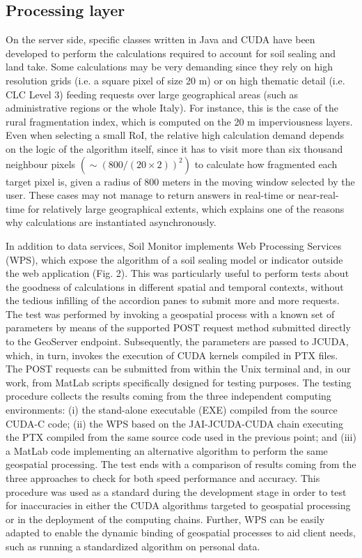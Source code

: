 \documentclass[APA,LATO1COL,doublespace]{WileyNJD-v2}
\begin{document}
\subsection{Processing layer}
On the server side, specific classes written in Java and CUDA have been developed to perform the calculations required to account for soil sealing and land take. 
Some calculations may be very demanding since they rely on high resolution grids (i.e. a square pixel of size 20 m) or on high thematic detail (i.e. CLC Level 3) feeding requests over large geographical areas (such as administrative regions or the whole Italy). For instance, this is the case of the rural fragmentation index, which is computed on the 20 m imperviousness layers. 
Even when selecting a small RoI, the relative high calculation demand depends on the logic of the algorithm itself, since it has to visit more than six thousand neighbour pixels $\left( \sim ( 800/\left(20\times2\right) )^2 \right)$ to calculate how fragmented each target pixel is, given a radius of 800 meters in the moving window selected by the user.
These cases may not manage to return answers in real-time or near-real-time for relatively large geographical extents, which explains one of the reasons why calculations are instantiated asynchronously.

In addition to data services, Soil Monitor implements Web Processing Services (WPS), which expose the algorithm of a soil sealing model or indicator outside the web application (Fig. 2). 
This was particularly useful to perform tests about the goodness of calculations in different spatial and temporal contexts, without the tedious infilling of the accordion panes to submit more and more requests. 
The test was performed by invoking a geospatial process with a known set of parameters by means of the supported POST request method submitted directly to the GeoServer endpoint. 
Subsequently, the parameters are passed to JCUDA, which, in turn, invokes the execution of CUDA kernels compiled in PTX files. 
The POST requests can be submitted from within the Unix terminal and, in our work, from MatLab scripts specifically designed for testing purposes. 
The testing procedure collects the results coming from the three independent computing environments: 
(i) the stand-alone executable (EXE) compiled from the source CUDA-C code; 
(ii) the WPS based on the JAI-JCUDA-CUDA chain executing the PTX compiled from the same source code used in the previous point; and 
(iii) a MatLab code implementing an alternative algorithm to perform the same geospatial processing. 
The test ends with a comparison of results coming from the three approaches to check for both speed performance and accuracy. 
This procedure was used as a standard during the development stage in order to test for inaccuracies in either the CUDA algorithms targeted to geospatial processing or in the deployment of the computing chains.
Further, WPS can be easily adapted to enable the dynamic binding of geospatial processes to aid client needs, such as running a standardized algorithm on personal data.
\end{document}
